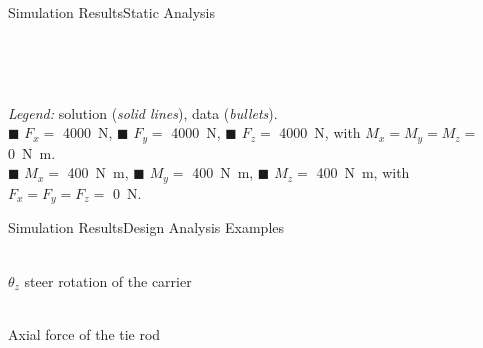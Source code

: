 \begin{frame}{Simulation Results}{Static Analysis}
  \begin{center}
    \begin{minipage}[c]{0.485\linewidth}
       \\[0.5em]
    \end{minipage}
    \begin{minipage}[c]{0.485\linewidth}
       \\[0.5em]
    \end{minipage}
    \raggedright{\small{\emph{Legend:} \TrussMe{} solution (\emph{solid lines}), \Ansys{} data (\emph{bullets}). \\ {\color{mycolor1}$\blacksquare$} $F_x =$ \SI{4000}{\newton}, {\color{mycolor2}$\blacksquare$} $F_y =$ \SI{4000}{\newton}, {\color{mycolor3}$\blacksquare$} $F_z =$ \SI{4000}{\newton}, with $M_x = M_y = M_z =$ \SI{0}{\newton\meter}. \\ {\color{mycolor4}$\blacksquare$} $M_x =$ \SI{400}{\newton\meter}, {\color{mycolor5}$\blacksquare$} $M_y =$ \SI{400}{\newton\meter}, {\color{mycolor6}$\blacksquare$} $M_z =$ \SI{400}{\newton\meter}, with $F_x = F_y = F_z =$ \SI{0}{\newton}.}}
  \end{center}
\end{frame}

\begin{frame}{Simulation Results}{Design Analysis Examples}
   \\[1.5em]
  \begin{center}
    \begin{minipage}[c]{0.475\linewidth}
       \\
      $\theta_z$ steer rotation of the carrier
      \\[0.5em]
    \end{minipage}
    \begin{minipage}[c]{0.475\linewidth}
       \\
      Axial force of the tie rod \\[0.5em]
    \end{minipage}
  \end{center}
\end{frame}

